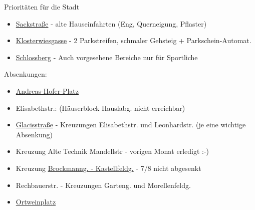 \documentclass{beamer}
\begin{document}
\begin{frame}{Prioritäten für die Stadt}

      \begin{itemize}
        \item \href{http://mm.linuxtage.at/osm/routing/wheelchair-normal/?z=18\&center=47.072334\%2C15.436612\&loc=47.072851\%2C15.436027\&loc=47.071806\%2C15.437288}{Sackstraße} - alte Hauseinfahrten (Eng, Querneigung, Pflaster)
        \item \href{http://mm.linuxtage.at/osm/routing/wheelchair-normal/?z=18\&center=47.066751\%2C15.444084\&loc=47.067038\%2C15.442953\&loc=47.066367\%2C15.443669}{Klosterwiesgasse} - 2 Parkstreifen, schmaler Gehsteig + Parkschein-Automat.
        \item \href{http://species.github.io/wheelchair-obstacles/normal.html\#18/47.07486/15.43702}{Schlossberg} - Auch vorgesehene Bereiche nur für Sportliche
      \end{itemize}

      \pause

   Absenkungen:
      \begin{itemize}
        \item \href{http://mm.linuxtage.at/osm/routing/wheelchair-normal/?z=19\&center=47.069237\%2C15.436494\&loc=47.069601\%2C15.435641\&loc=47.069614\%2C15.436016\&hl=en\&ly=\&alt=\&df=\&srv=}{Andreas-Hofer-Platz}
        \item Elisabethstr.: (Häuserblock Hauslabg. nicht erreichbar)
        \item \href{http://mm.linuxtage.at/osm/routing/wheelchair-normal/?z=18\&center=47.073412\%2C15.446692\&loc=47.073564\%2C15.446729\&loc=47.073728\%2C15.447008\&hl=en\&ly=\&alt=\&df=\&srv=}{Glacisstraße} - Kreuzungen Elisabethstr. und Leonhardstr. (je eine wichtige Absenkung)
        \item Kreuzung Alte Technik Mandellstr - vorigen Monat erledigt :-)
        \item Kreuzung \href{http://species.github.io/wheelchair-obstacles/normal.html\#20/47.06354/15.44819}{Brockmanng. - Kastellfeldg.} - 7/8 nicht abgesenkt
        \item Rechbauerstr. - Kreuzungen Garteng. und Morellenfeldg.
        \item \href{http://mm.linuxtage.at/osm/routing/wheelchair-normal/?z=19\&center=47.063975\%2C15.444074\&loc=47.063841\%2C15.444087\&loc=47.064159\%2C15.444669\&hl=en\&ly=\&alt=\&df=\&srv=}{Ortweinplatz}
      \end{itemize}

\end{frame}
\end{document}
